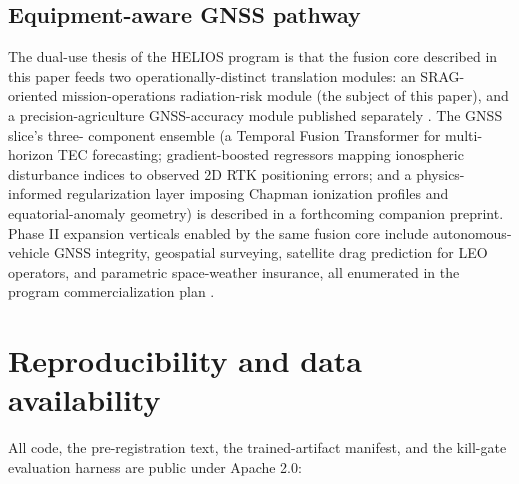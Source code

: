 \documentclass[11pt,letterpaper]{article}
\begin{document}
\subsection{Equipment-aware GNSS pathway}

The dual-use thesis of the HELIOS program is that the fusion core
described in this paper feeds two operationally-distinct translation
modules: an SRAG-oriented mission-operations radiation-risk module
(the subject of this paper), and a precision-agriculture GNSS-accuracy
module published separately \cite{gannon_rtk}.  The GNSS slice's three-
component ensemble (a Temporal Fusion Transformer \cite{lim2021} for
multi-horizon TEC forecasting; gradient-boosted regressors mapping
ionospheric disturbance indices to observed 2D RTK positioning errors;
and a physics-informed regularization layer imposing Chapman ionization
profiles and equatorial-anomaly geometry) is described in a forthcoming
companion preprint.  Phase II expansion verticals enabled by the same
fusion core include autonomous-vehicle GNSS integrity, geospatial
surveying, satellite drag prediction for LEO operators, and parametric
space-weather insurance, all enumerated in the program commercialization
plan \cite{helios_program}.

\section{Reproducibility and data availability}
\label{sec:repro}

All code, the pre-registration text, the trained-artifact manifest, and
the kill-gate evaluation harness are public under Apache 2.0:
\end{document}
